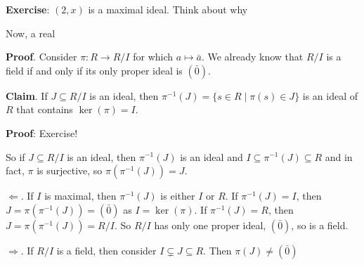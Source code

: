 \documentclass[12pt]{article}
\begin{document}
{\bf Exercise}: $(2, x)$ is a maximal ideal. Think about why

Now, a real



{\bf Proof}. Consider $\pi: R \to R / I$ for which $a \mapsto \bar a$. We
already know that $R / I$ is a field if and only if its only proper ideal is
$(\bar 0)$.

{\bf Claim}. If $J \subseteq R / I$ is an ideal, then $\pi^{-1}(J) = \{s \in R
\mid \pi(s) \in J \}$ is an ideal of $R$ that contains $\ker(\pi) = I$.

{\bf Proof}: Exercise!

So if $J \subseteq R / I$ is an ideal, then $\pi^{-1}(J)$ is an ideal and $I
\subseteq \pi^{-1}(J) \subseteq R$ and in fact, $\pi$ is surjective, so
$\pi(\pi^{-1}(J)) = J$.

$\Leftarrow$. If $I$ is maximal, then $\pi^{-1}(J)$ is either $I$ or $R$. If
$\pi^{-1}(J) = I$, then $J = \pi(\pi^{-1}(J)) = (\bar 0)$ as $I = \ker(\pi)$. If
$\pi^{-1}(J) = R$, then $J = \pi(\pi^{-1}(J)) = R / I$. So $R / I$ has only one
proper ideal, $(\bar 0)$, so is a field.

$\Rightarrow$. If $R / I$ is a field, then consider $I \subsetneq J \subseteq
R$. Then $\pi(J) \ne (\bar 0)$
\end{document}
